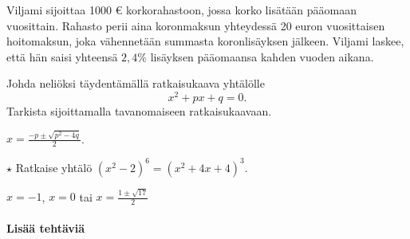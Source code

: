 \begin{tehtavasivu}
\begin{tehtava}
	Viljami sijoittaa 1000 € korkorahastoon, jossa korko lisätään pääomaan vuosittain. Rahasto perii aina koronmaksun yhteydessä
	20 euron vuosittaisen hoitomaksun, joka vähennetään summasta koronlisäyksen jälkeen. Viljami laskee, että hän saisi yhteensä $2,4\%$ lisäyksen
	pääomaansa kahden vuoden aikana.
        \begin{alakohdat}
        \end{alakohdat}
	\begin{vastaus}
	    \begin{alakohdat}
	    \end{alakohdat}
	\end{vastaus}
\end{tehtava}


\begin{tehtava}
	Johda neliöksi täydentämällä ratkaisukaava yhtälölle
	\[ x^2 +px+q=0. \]
	Tarkista sijoittamalla tavanomaiseen ratkaisukaavaan.
	\begin{vastaus}
		$x=\frac{-p \pm \sqrt{p^2-4q}}{2}$.
	\end{vastaus}
\end{tehtava}

\begin{tehtava} %
	$\star$ Ratkaise yhtälö $(x^2-2)^6=(x^2+4x+4)^3$.
	\begin{vastaus}
		$x=-1$, $x=0$ tai $x=\frac{1 \pm \sqrt{17}}{2}$
	\end{vastaus}
\end{tehtava}


\paragraph*{Lisää tehtäviä}


\end{tehtavasivu}

